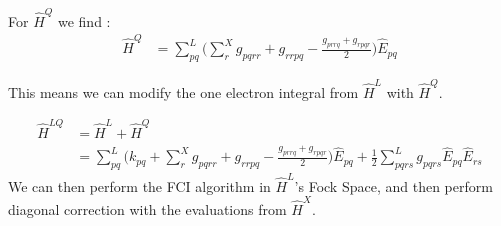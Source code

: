 For $\hat{{H}}^{Q}$ we find :
\begin{align}
   \hat{{H}}^{Q}  &= \sum_{pq}^L \Big(\sum^{X}_r g_{pqrr} + g_{rrpq} - \frac{g_{prrq} + g_{rpqr}}{2}  \Big)  \hat{E}_{pq}
\end{align}

This means we can modify the one electron integral from $\hat{{H}}^{L}$ with $\hat{{H}}^{Q}$.

\begin{align}
   \hat{{H}}^{LQ}  &=  \hat{{H}}^{L} + \hat{{H}}^{Q} \\
                  &=  \sum_{pq}^L \Big(k_{pq} + \sum^{X}_r g_{pqrr} + g_{rrpq} - \frac{g_{prrq} + g_{rpqr}}{2} \Big) \hat{E}_{pq} + \frac{1}{2} \sum_{pqrs}^L g_{pqrs} \hat{E}_{pq} \hat{E}_{rs}
\end{align}
We can then perform the FCI algorithm in $\hat{{H}}^{L}$'s Fock Space, and then perform diagonal correction with the evaluations from $\hat{{H}}^{X}$.
